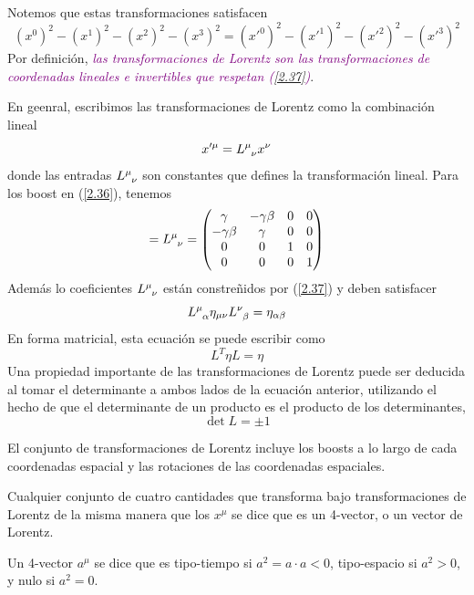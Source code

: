 Notemos que estas transformaciones satisfacen
\begin{equation}\label{2.37}
    (x^0)^2-(x^1)^2-(x^2)^2-(x^3)^2=(x'^0)^2-(x'^1)^2-(x'^2)^2-(x'^3)^2
\end{equation}
Por definición, \textcolor{purple}{\textit{las transformaciones de Lorentz son las transformaciones de coordenadas lineales e invertibles que respetan (\ref{2.37})}}.

En geenral, escribimos las transformaciones de Lorentz como la combinación lineal
\begin{equation}
    x'^\mu=\tensor{L}{^\mu_\nu}x^\nu
\end{equation}
donde las entradas $\tensor{L}{^\mu_\nu}$ son constantes que defines la transformación lineal. Para los boost en (\ref{2.36}), tenemos
\begin{equation}
    [L]=\tensor{L}{^\mu_\nu}=\mqty(\gamma&-\gamma\beta&0&0\\-\gamma\beta&\gamma&0&0\\0&0&1&0\\0&0&0&1)
\end{equation}
Además lo coeficientes $\tensor{L}{^\mu_\nu}$ están constreñidos por (\ref{2.37}) y deben satisfacer
\begin{equation}
    \tensor{L}{^\mu_\alpha}\eta_{\mu\nu}\tensor{L}{^\nu_\beta}=\eta_{\alpha\beta}
\end{equation}
En forma matricial, esta ecuación se puede escribir como
\begin{equation}
    L^T\eta L=\eta
\end{equation}
Una propiedad importante de las transformaciones de Lorentz puede ser deducida al tomar el determinante a ambos lados de la ecuación anterior, utilizando el hecho de que el determinante de un producto es el producto de los determinantes,
\begin{equation}
    \det L=\pm 1
\end{equation}

El conjunto de transformaciones de Lorentz incluye los boosts a lo largo de cada coordenadas espacial y las rotaciones de las coordenadas espaciales.

Cualquier conjunto de cuatro cantidades que transforma bajo transformaciones de Lorentz de la misma manera que los $x^\mu$ se dice que es un 4-vector, o un vector de Lorentz.

Un 4-vector $a^\mu$ se dice que es tipo-tiempo si $a^2=a\cdot a<0$, tipo-espacio si $a^2>0$, y nulo si $a^2=0$. 


